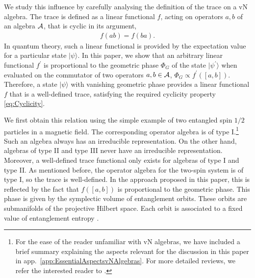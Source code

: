 \documentclass[a4paper,11pt]{article}
\newcommand{\1}{\mathds{1}}
\newcommand{\p}{{\prime}}
\begin{document}
We study this influence by carefully analysing the definition of the trace on a vN algebra. The trace is defined as a linear functional $f$, acting on operators $a,b$ of an algebra ${\cal A}$, that is cyclic in its argument,
\begin{align}
    f(ab)=f(ba).\label{eq:Cyclicity}
\end{align}
In quantum theory, such a linear functional is provided by the expectation value for a particular state $|\psi\rangle$. In this paper, we show that an arbitrary linear functional $f^\p$ is proportional to the geometric phase $\Phi_G$ of the state $|\psi^\p\rangle$ when evaluated on the commutator of two operators $a,b\in{\cal A}$, $\Phi_G\propto f^\p([a,b])$. Therefore, a state $|\psi\rangle$ with vanishing geometric phase provides a linear functional $f$ that is a well-defined trace, satisfying the required cyclicity property \eqref{eq:Cyclicity}.

We first obtain this relation using the simple example of two entangled spin $1/2$ particles in a magnetic field. The corresponding operator algebra is of type I.\footnote{For the ease of the reader unfamiliar with vN algebras, we have included a brief summary explaining the aspects relevant for the discussion in this paper in app.~\ref{app:EssentialAspectsvNAlgebras}. For more detailed reviews, we refer the interested reader to \cite{Witten:2018zxz,Witten:2021jzq,Sorce:2023fdx}.} Such an algebra always has an irreducible representation. On the other hand, algebras of type II and type III never have an irreducible representation.  Moreover, a well-defined trace functional only exists for algebras of type I and type II. As mentioned before, the operator algebra for the two-spin system is of type I, so the trace is well-defined. In the approach proposed in this paper, this is reflected by the fact that $f([a,b])$ is proportional to the geometric phase. This phase is given by the symplectic volume of entanglement orbits. These orbits are submanifolds of the projective Hilbert space. Each orbit is associated to a fixed value of entanglement entropy \cite{Sinolecka2002manifolds}. 
\end{document}
